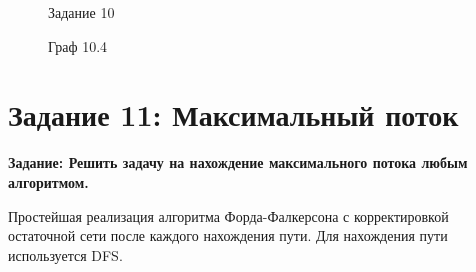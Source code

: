 \documentclass[otchet]{SCWorks}
\begin{document}
\begin{figure}[H]
	\caption{Задание 10}
	\label{pic10_4}
\end{figure}

\begin{figure}[H]
	\caption{Граф 10.4}
	\label{gr10_4}
\end{figure}
\section{Задание 11: Максимальный поток}

\textbf{Задание: Решить задачу на нахождение максимального потока любым алгоритмом.}

Простейшая реализация алгоритма Форда-Фалкерсона с корректировкой остаточной сети после каждого нахождения пути. Для нахождения пути используется DFS. 
\end{document}
